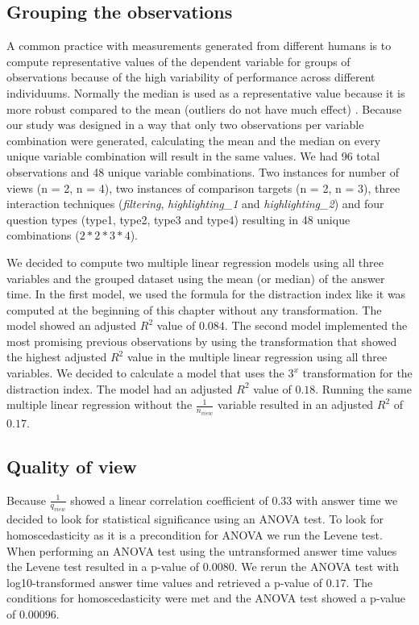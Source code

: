 \subsection{Grouping the observations}
A common practice with measurements generated from different humans is to compute representative values of the dependent variable for groups of
observations because of the high variability of performance across different individuums. Normally the median is used as a representative value because
it is more robust compared to the mean (outliers do not have much effect) \citep*{Daszykowski.2007}. Because our study was designed in a way that
only two observations per variable combination were generated, calculating the mean and the median
on every unique variable combination will result in the same values. We had 96 total observations and 48 unique variable combinations. Two instances
for number of views (n = 2, n = 4), two instances of comparison targets (n = 2, n = 3), three interaction techniques (\textit{filtering},
\textit{highlighting\_1} and \textit{highlighting\_2}) and four question types (type1, type2, type3 and type4) resulting in 48 unique combinations
($2 * 2 * 3 * 4$).

We decided to compute two multiple linear regression models using all three variables and the grouped dataset using the mean (or median) of the answer
time. In the first model, we used the formula for the distraction index like it was computed at the beginning of this chapter without any transformation.
The model showed an adjusted $R^2$ value of $0.084$. The second model implemented the most promising previous observations by using the transformation
that showed the highest adjusted $R^2$ value in the multiple linear regression using all three variables. We decided to calculate a model that uses the
$3^x$ transformation for the distraction index. The model had an adjusted $R^2$ value of $0.18$. Running the same multiple linear regression without the
$\frac{1}{n_{view}}$ variable resulted in an adjusted $R^2$ of $0.17$.

\subsection{Quality of view}
Because $\frac{1}{q_{view}}$ showed a linear correlation coefficient of $0.33$ with answer time we decided to look for statistical significance using
an ANOVA test. To look for homoscedasticity as it is a precondition for ANOVA we run the Levene test. When performing an ANOVA test using the untransformed
answer time values the Levene test resulted in a p-value of $0.0080$. We rerun the ANOVA test with log10-transformed answer time values and retrieved a p-value
of $0.17$. The conditions for homoscedasticity were met and the ANOVA test showed a p-value of $0.00096$.

